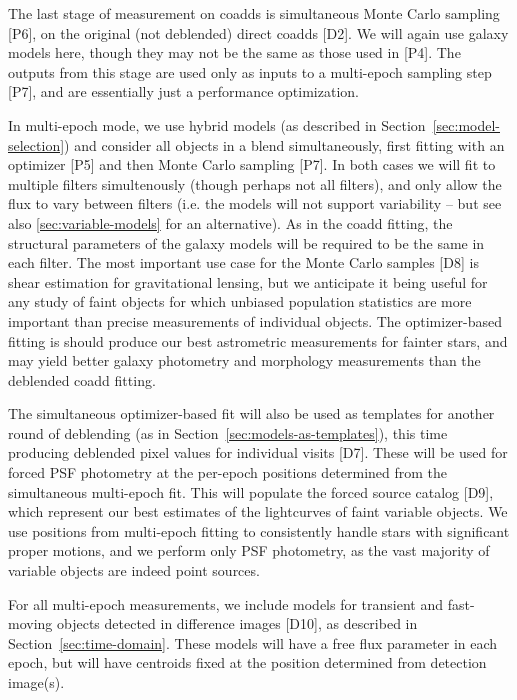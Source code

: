\documentclass[10pt]{article}
\begin{document}
The last stage of measurement on coadds is simultaneous Monte Carlo sampling
[P6], on the original (not deblended) direct coadds [D2].  We will again use
galaxy models here, though they may not be the same as those used in [P4].
The outputs from this stage are used only as inputs to a multi-epoch
sampling step [P7], and are essentially just a performance optimization.

In multi-epoch mode, we use hybrid models (as described in
Section~\ref{sec:model-selection}) and consider all objects in a blend
simultaneously, first fitting with an optimizer [P5] and then Monte Carlo
sampling [P7].  In both cases we will fit to multiple filters simultenously
(though perhaps not all filters), and only allow the flux to vary between
filters (i.e. the models will not support variability -- but see also
\ref{sec:variable-models} for an alternative).  As in the coadd fitting, the
structural parameters of the galaxy models will be required to be the same in
each filter.  The most important use case for the Monte Carlo samples [D8] is
shear estimation for gravitational lensing, but we anticipate it being useful
for any study of faint objects for which unbiased population statistics are
more important than precise measurements of individual objects.  The
optimizer-based fitting is should produce our best astrometric measurements
for fainter stars, and may yield better galaxy photometry and morphology
measurements than the deblended coadd fitting.

The simultaneous optimizer-based fit will also be used as templates for
another round of deblending (as in Section~\ref{sec:models-as-templates}),
this time producing deblended pixel values for individual visits [D7].  These
will be used for forced PSF photometry at the per-epoch positions determined
from the simultaneous multi-epoch fit.  This will populate the forced source
catalog [D9], which represent our best estimates of the lightcurves of
faint variable objects.  We use positions from multi-epoch fitting to
consistently handle stars with significant proper motions, and we perform only
PSF photometry, as the vast majority of variable objects are indeed point
sources.

For all multi-epoch measurements, we include models for transient and fast-
moving objects detected in difference images [D10], as described in
Section~\ref{sec:time-domain}. These models will have a free flux
parameter in each epoch, but will have centroids fixed at the position
determined from detection image(s).
\end{document}
